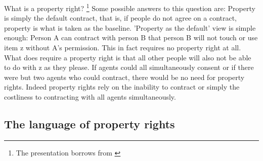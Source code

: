 \documentclass[12pt]{article}
\numberwithin{equation}{section}
\begin{document}
What is a property right? \footnote{The presentation borrows from \cite{Munzer1990}}
Some possible answers to this question are: Property is simply the default contract, that is, if people do not agree on a contract, property is what is taken as the baseline. 'Property as the default' view is simple enough: Person A can contract with person B that person B will not touch or use item z without A's permission. This in fact requires no property right at all. What does require a property right is that all other people will also not be able to do with z as they please. If agents could all simultaneously consent or if there were but two agents who could contract, there would be no need for property rights. Indeed property rights rely on the inability to contract or simply the costliness to contracting with all agents simultaneously.



\subsection{The language of property rights}
\end{document}
